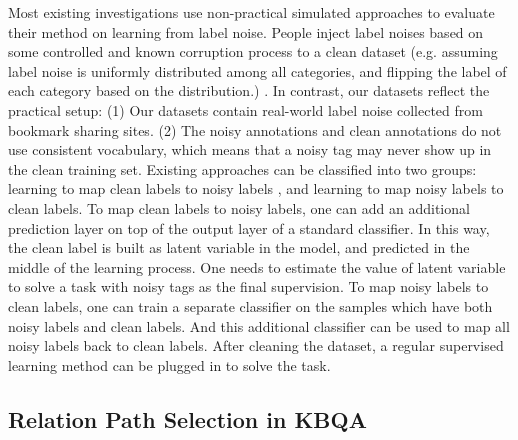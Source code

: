 Most existing investigations use non-practical simulated approaches to evaluate their method on learning from label noise. People inject label noises based on some controlled and known corruption process to a clean dataset (e.g. assuming label noise is uniformly distributed among all categories, and flipping the label of each category based on the distribution.) \cite{zhang2018generalized,tanaka2018joint,yi2019probabilistic}. In contrast, our datasets reflect the practical setup: (1) Our datasets contain real-world label noise collected from bookmark sharing sites. (2) The noisy annotations and clean annotations do not use consistent vocabulary, which means that a noisy tag may never show up in the clean training set. Existing approaches can be classified into two groups: learning to map clean labels to noisy labels \cite{sukhbaatar2014learning2,sukhbaatar2014training2,goldberger2016training2}, and learning to map noisy labels to clean labels\cite{dehghani2017fidelity2,wu2018light,yuan2018iterative}. To map clean labels to noisy labels, one can add an additional prediction layer on top of the output layer of a standard classifier. In this way, the clean label is built as latent variable in the model, and predicted in the middle of the learning process. One needs to estimate the value of latent variable to solve a task with noisy tags as the final supervision. To map noisy labels to clean labels, one can train a separate classifier on the samples which have both noisy labels and clean labels. And this additional classifier can be used to map all noisy labels back to clean labels. After cleaning the dataset, a regular supervised learning method can be plugged in to solve the task.



\subsection{Relation Path Selection in KBQA}  \label{future_path}

